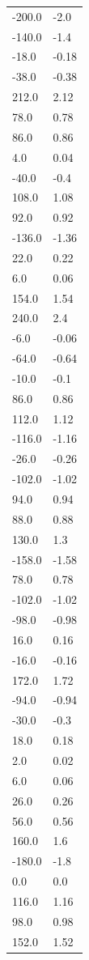 \begin{longtable}{ll}
-200.0 & -2.0 \\
-140.0 & -1.4 \\
-18.0 & -0.18 \\
-38.0 & -0.38 \\
212.0 & 2.12 \\
78.0 & 0.78 \\
86.0 & 0.86 \\
4.0 & 0.04 \\
-40.0 & -0.4 \\
108.0 & 1.08 \\
92.0 & 0.92 \\
-136.0 & -1.36 \\
22.0 & 0.22 \\
6.0 & 0.06 \\
154.0 & 1.54 \\
240.0 & 2.4 \\
-6.0 & -0.06 \\
-64.0 & -0.64 \\
-10.0 & -0.1 \\
86.0 & 0.86 \\
112.0 & 1.12 \\
-116.0 & -1.16 \\
-26.0 & -0.26 \\
-102.0 & -1.02 \\
94.0 & 0.94 \\
88.0 & 0.88 \\
130.0 & 1.3 \\
-158.0 & -1.58 \\
78.0 & 0.78 \\
-102.0 & -1.02 \\
-98.0 & -0.98 \\
16.0 & 0.16 \\
-16.0 & -0.16 \\
172.0 & 1.72 \\
-94.0 & -0.94 \\
-30.0 & -0.3 \\
18.0 & 0.18 \\
2.0 & 0.02 \\
6.0 & 0.06 \\
26.0 & 0.26 \\
56.0 & 0.56 \\
160.0 & 1.6 \\
-180.0 & -1.8 \\
0.0 & 0.0 \\
116.0 & 1.16 \\
98.0 & 0.98 \\
152.0 & 1.52 \\

\end{longtable}
